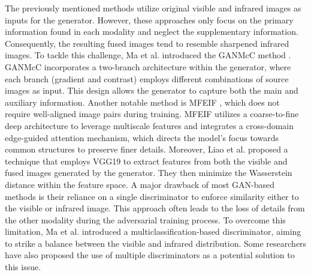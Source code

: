 The previously mentioned methods utilize original visible and infrared images as inputs for the generator. However, these approaches only focus on the primary information found in each modality and neglect the supplementary information. Consequently, the resulting fused images tend to resemble sharpened infrared images. To tackle this challenge, Ma et al. introduced the GANMcC method \cite{ma2020ganmcc}. GANMcC incorporates a two-branch architecture within the generator, where each branch (gradient and contrast) employs different combinations of source images as input. This design allows the generator to capture both the main and auxiliary information. Another notable method is MFEIF \cite{liu2021learning}, which does not require well-aligned image pairs during training. MFEIF utilizes a coarse-to-fine deep architecture to leverage multiscale features and integrates a cross-domain edge-guided attention mechanism, which directs the model's focus towards common structures to preserve finer details. Moreover, Liao et al. proposed a technique \cite{liao2020fusion} that employs VGG19 to extract features from both the visible and fused images generated by the generator. They then minimize the Wasserstein distance within the feature space. A major drawback of most GAN-based methods is their reliance on a single discriminator to enforce similarity either to the visible or infrared image. This approach often leads to the loss of details from the other modality during the adversarial training process. To overcome this limitation, Ma et al. \cite{ma2020ganmcc} introduced a multiclassification-based discriminator, aiming to strike a balance between the visible and infrared distribution. Some researchers have also proposed the use of multiple discriminators as a potential solution to this issue.

